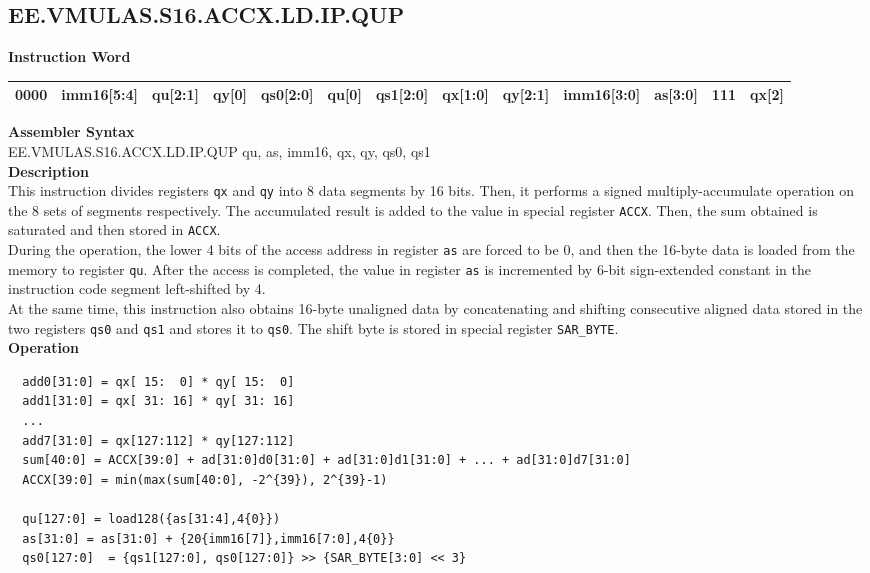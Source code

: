 \clearpage
\subsection{EE.VMULAS.S16.ACCX.LD.IP.QUP}\label{instruction:EEVMULASS16ACCXLDIPQUP}
\setlength\tabcolsep{5pt}
\textbf{Instruction Word} \\
\begin{tabular}{|c|c|c|c|c|c|c|c|c|c|c|c|c|}
	\hline
	0000 & imm16[5:4] & qu[2:1] & qy[0] & qs0[2:0] & qu[0] & qs1[2:0] & qx[1:0] & qy[2:1] & imm16[3:0] & as[3:0] & 111 & qx[2] \\
	\hline
\end{tabular}

\textbf{Assembler Syntax} \\
EE.VMULAS.S16.ACCX.LD.IP.QUP qu, as, imm16, qx, qy, qs0, qs1 \\
\textbf{Description} \\
This instruction divides registers \lstinline{qx} and \lstinline{qy} into 8 data segments by 16 bits. Then, it performs a signed multiply-accumulate operation on the 8 sets of segments respectively. The accumulated result is added to the value in special register \lstinline{ACCX}. Then, the sum obtained is saturated and then stored in \lstinline{ACCX}.\\
During the operation, the lower 4 bits of the access address in register \lstinline{as} are forced to be 0, and then the 16-byte data is loaded from the memory to register \lstinline{qu}. After the access is completed, the value in register \lstinline{as} is incremented by 6-bit sign-extended constant in the instruction code segment left-shifted by 4.\\
At the same time, this instruction also obtains 16-byte unaligned data by concatenating and shifting consecutive aligned data stored in the two registers \lstinline{qs0} and \lstinline{qs1} and stores it to \lstinline{qs0}. The shift byte is stored in special register \lstinline{SAR_BYTE}.\\
\textbf{Operation}
\begin{lstlisting}
  add0[31:0] = qx[ 15:  0] * qy[ 15:  0]
  add1[31:0] = qx[ 31: 16] * qy[ 31: 16]
  ...
  add7[31:0] = qx[127:112] * qy[127:112]
  sum[40:0] = ACCX[39:0] + ad[31:0]d0[31:0] + ad[31:0]d1[31:0] + ... + ad[31:0]d7[31:0]
  ACCX[39:0] = min(max(sum[40:0], -2^{39}), 2^{39}-1)

  qu[127:0] = load128({as[31:4],4{0}})
  as[31:0] = as[31:0] + {20{imm16[7]},imm16[7:0],4{0}}
  qs0[127:0]  = {qs1[127:0], qs0[127:0]} >> {SAR_BYTE[3:0] << 3}
\end{lstlisting}

